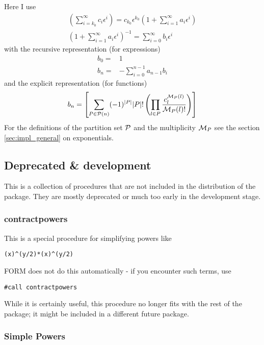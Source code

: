 \documentclass{article}
\begin{document}
Here I use
\begin{align}
  \label{eq:inv}
  \left(\sum_{i=k_0}^{\infty}c_i
    \epsilon^i\right)=c_{k_0}\epsilon^{k_0}\left(1+\sum_{i=1}^{\infty}a_i
    \epsilon^i\right)\\
\left(1+\sum_{i=1}^{\infty}a_i \epsilon^i\right)^{-1}=\sum_{i=0}^{\infty}b_i \epsilon^i
\end{align}
with the recursive representation (for expressions)
\begin{align}
  \label{eq:inv_rec}
  b_0=&1\\
  b_n=&-\sum_{i=0}^{n-1} a_{n-1}b_i 
\end{align}
and the explicit representation (for functions)
\begin{equation}
  \label{eq:inv_expl}
  b_n=\left[\sum_{P \in {\cal P}(n)} (-1)^{|P|}|P|!\left(\prod_{l \in P} \frac{c^{{\cal M}_P(l)}_l}{{\cal M}_P(l)!} \right)\right]
\end{equation}
For the definitions of the partition set ${\cal P}$ and the
multiplicity ${\cal M}_P$ see the section \ref{sec:impl_general} on
exponentials.

\subsection{Deprecated \& development}
\label{sec:depr}

This is a collection of procedures that are not included in the
distribution of the package. They are mostly deprecated or much too
early in the development stage.

\subsubsection{contractpowers}
\label{sec:cpow}

This is a special procedure for simplifying powers like
\begin{verbatim}
(x)^(y/2)*(x)^(y/2)
\end{verbatim}
FORM does not do this automatically - if you encounter such terms, use
\begin{verbatim}
#call contractpowers
\end{verbatim}
While it is certainly useful, this procedure no longer fits with the
rest of the package; it might be included in a different future package.


\subsubsection{Simple Powers}
\label{sec:impl_simpl_pow}
\end{document}
